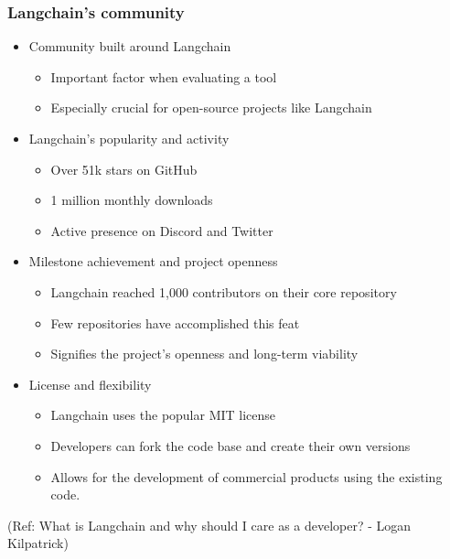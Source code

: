 \begin{frame}[fragile]\frametitle{Langchain’s community}

\begin{itemize}
\item Community built around Langchain
	\begin{itemize}
	\item Important factor when evaluating a tool
	\item Especially crucial for open-source projects like Langchain
	\end{itemize}
	
\item Langchain's popularity and activity
	\begin{itemize}
	\item Over 51k stars on GitHub
	\item 1 million monthly downloads
	\item Active presence on Discord and Twitter
	\end{itemize}
	
\item Milestone achievement and project openness
	\begin{itemize}
	\item Langchain reached 1,000 contributors on their core repository
	\item Few repositories have accomplished this feat
	\item Signifies the project's openness and long-term viability
	\end{itemize}

\item License and flexibility
	\begin{itemize}
	\item Langchain uses the popular MIT license
	\item Developers can fork the code base and create their own versions
	\item Allows for the development of commercial products using the existing code.
	\end{itemize}
\end{itemize}

{\tiny (Ref: What is Langchain and why should I care as a developer? - Logan Kilpatrick)}

\end{frame}

